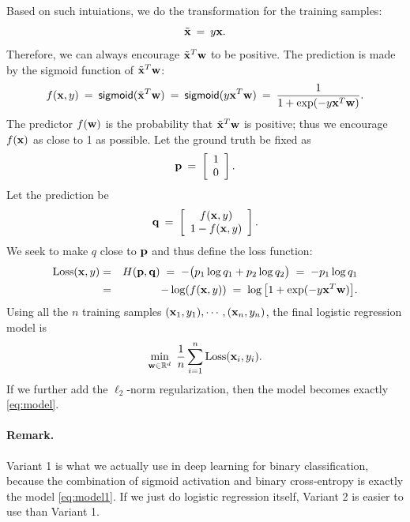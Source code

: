 \documentclass[11pt]{article}
\numberwithin{equation}{section}
\def\pp{{\bf p}}
\def\q{{\bf q}}
\def\w{{\bf w}}
\def\x{{\bf x}}
\def\RB{{\mathbb R}}
\def\sigmoid{\mathsf{sigmoid}}
\begin{document}
Based on such intuiations, 
we do the transformation for the training samples:
\begin{equation*}
\tilde{\x} \: = \: y \x .
\end{equation*}
Therefore, we can always encourage  $\tilde{\x}^T \w$ to be positive.
The prediction is made by the sigmoid function of $\tilde{\x}^T \w$:
\begin{equation*}
f (\x, y)
\: = \:
\sigmoid ( \tilde{\x}^T \w ) 
\: = \:
\sigmoid ( y {\x}^T \w ) 
\: = \: \frac{1}{ 1 + \exp (-y \x^T \w ) } .
\end{equation*}
The predictor $f(\w)$ is the probability that $\tilde{\x}^T \w$ is positive;
thus we encourage $f(\x)$ as close to 1 as possible.
Let the ground truth be fixed as
\begin{equation*}
\pp \: = \: 
\left[
\begin{array}{c}
1 \\
0 \\
\end{array}
\right].
\end{equation*}
Let the prediction be
\begin{equation*}
\q \: = \: 
\left[
\begin{array}{c}
f (\x, y) \\
1 - f (\x, y) \\
\end{array}
\right] .
\end{equation*}
We seek to make $q$ close to $\pp$ and thus define the loss function:
\begin{eqnarray*}
	\textrm{Loss} (\x, y)
	& = & H (\pp , \q )
	\; = \; - \big( p_1 \log q_1 + p_2 \log q_2 \big) 
	\; = \; - p_1 \log q_1 \\
	& = & - \log (f(\x, y)) 
	\; = \; \log \big[ 1 + \exp ( - y \x^T \w ) \big].
\end{eqnarray*}
Using all the $n$ training samples $(\x_1, y_1), \cdots , (\x_n, y_n)$, the final logistic regression model is
\begin{equation*}
\min_{\w \in \RB^d} \; \frac{1}{n} \sum_{i=1}^{n} \textrm{Loss} (\x_i, y_i ) .
\end{equation*}
If we further add the $\ell_2$-norm regularization, then the model becomes exactly \eqref{eq:model}.


\paragraph{Remark.}
Variant 1 is what we actually use in deep learning for binary classification, because the combination of sigmoid activation and binary cross-entropy is exactly the model \eqref{eq:model1}.
If we just do logistic regression itself, Variant 2 is easier to use than Variant 1.
\end{document}
